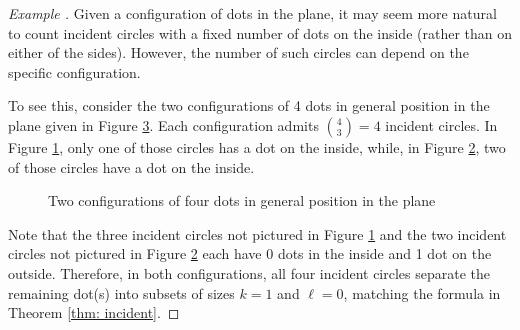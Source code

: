 \documentclass[11pt,oneside]{amsart}
\theoremstyle{definition}
\theoremstyle{remark}
\newenvironment{ex}{\refstepcounter{thm}\begin{proof}[Example \emph{\thethm}]\renewcommand*{\qedsymbol}{\(\blacksquare\)}}{\end{proof}}
\numberwithin{equation}{section}
\begin{document}
\begin{ex}\label{ex: interiorcircles}
Given a configuration of dots in the plane, it may seem more natural to count incident circles with a fixed number of dots on the inside (rather than on either of the sides). However, the number of such circles can depend on the specific configuration.

To see this, consider the two configurations of 4 dots in general position in the plane given in Figure \ref{fig: fourdots}. Each configuration admits $\binom{4}{3}=4$ incident circles. In Figure \ref{fig: fourdotsonecircle}, only one of those circles has a dot on the inside, while, in Figure \ref{fig: fourdotstwocircles}, two of those circles have a dot on the inside.

\begin{figure}[h!tb]
\captionsetup[subfigure]{justification=centering}
\centering
\begin{subfigure}[c]{0.45\linewidth}
\centering
{}
\label{fig: fourdotsonecircle}
\end{subfigure}
\begin{subfigure}[c]{0.45\linewidth}
\centering
{}
\label{fig: fourdotstwocircles}
\end{subfigure}
\caption{Two configurations of four dots in general position in the plane}
\label{fig: fourdots}
\end{figure}

Note that the three incident circles not pictured in 
Figure \ref{fig: fourdotsonecircle} and the two incident circles not pictured in Figure \ref{fig: fourdotstwocircles} each have 0 dots in the inside and 1 dot on the outside.
Therefore, in both configurations, all four incident circles separate the remaining dot(s) into subsets of sizes $k=1$ and $\ell=0$, matching the formula in Theorem \ref{thm: incident}.
\end{ex}
\end{document}
